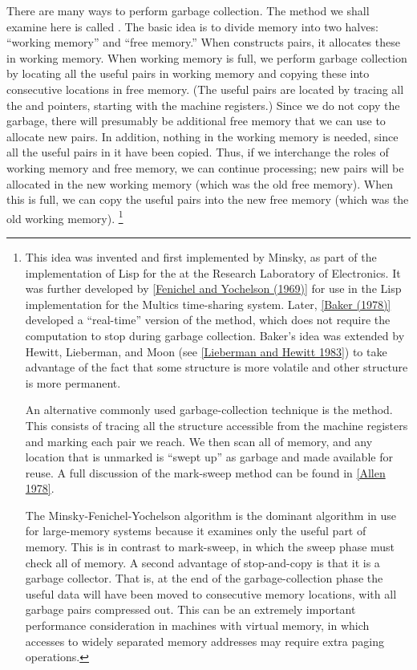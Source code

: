 There are many ways to perform garbage collection.
The method we shall examine here is called .
The basic idea is to divide memory into two halves:
“working memory” and “free memory.”
When  constructs pairs, it allocates these in working memory.
When working memory is full, we perform garbage collection by locating all the useful pairs in working memory and copying these into consecutive locations in free memory.
(The useful pairs are located by tracing all the  and  pointers, starting with the machine registers.)
Since we do not copy the garbage, there will presumably be additional free memory that we can use to allocate new pairs.
In addition, nothing in the working memory is needed, since all the useful pairs in it have been copied.
Thus, if we interchange the roles of working memory and free memory, we can continue processing;
new pairs will be allocated in the new working memory (which was the old free memory).
When this is full, we can copy the useful pairs into the new free memory (which was the old working memory).%
\footnote{
	This idea was invented and first implemented by Minsky, as part of the implementation of Lisp for the  at the  Research Laboratory of Electronics.
	It was further developed by \cref{Fenichel and Yochelson (1969)} for use in the Lisp implementation for the Multics time-sharing system.
	Later, \cref{Baker (1978)} developed a “real-time” version of the method, which does not require the computation to stop during garbage collection.
	Baker’s idea was extended by Hewitt, Lieberman, and Moon (see \cref{Lieberman and Hewitt 1983}) to take advantage of the fact that some structure is more volatile and other structure is more permanent.

	An alternative commonly used garbage-collection technique is the  method.
	This consists of tracing all the structure accessible from the machine registers and marking each pair we reach.
	We then scan all of memory, and any location that is unmarked is “swept up” as garbage and made available for reuse.
	A full discussion of the mark-sweep method can be found in \cref{Allen 1978}.

	The Minsky-Fenichel-Yochelson algorithm is the dominant algorithm in use for large-memory systems because it examines only the useful part of memory.
	This is in contrast to mark-sweep, in which the sweep phase must check all of memory.
	A second advantage of stop-and-copy is that it is a  garbage collector.
	That is, at the end of the garbage-collection phase the useful data will have been moved to consecutive memory locations, with all garbage pairs compressed out.
	This can be an extremely important performance consideration in machines with virtual memory, in which accesses to widely separated memory addresses may require extra paging operations.
}




